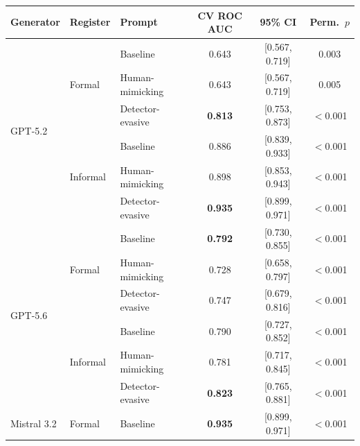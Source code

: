 \begin{table}[h!]
  \centering
  \small
  \begin{tabular}{lllccc}
    \toprule
    Generator & Register & Prompt & CV ROC AUC & 95\% CI & Perm.\ $p$ \\
    \midrule
    \multirow{6}{*}{GPT-5.2}
      & \multirow{3}{*}{Formal}
        & Baseline         & 0.643 & [0.567, 0.719] & 0.003 \\
      & & Human-mimicking  & 0.643 & [0.567, 0.719] & 0.005 \\
      & & Detector-evasive & \textbf{0.813} & [0.753, 0.873] & $<$0.001 \\
    \cmidrule(l){2-6}
      & \multirow{3}{*}{Informal}
        & Baseline         & 0.886 & [0.839, 0.933] & $<$0.001 \\
      & & Human-mimicking  & 0.898 & [0.853, 0.943] & $<$0.001 \\
      & & Detector-evasive & \textbf{0.935} & [0.899, 0.971] & $<$0.001 \\
    \midrule
    \multirow{6}{*}{GPT-5.6}
      & \multirow{3}{*}{Formal}
        & Baseline         & \textbf{0.792} & [0.730, 0.855] & $<$0.001 \\
      & & Human-mimicking  & 0.728 & [0.658, 0.797] & $<$0.001 \\
      & & Detector-evasive & 0.747 & [0.679, 0.816] & $<$0.001 \\
    \cmidrule(l){2-6}
      & \multirow{3}{*}{Informal}
        & Baseline         & 0.790 & [0.727, 0.852] & $<$0.001 \\
      & & Human-mimicking  & 0.781 & [0.717, 0.845] & $<$0.001 \\
      & & Detector-evasive & \textbf{0.823} & [0.765, 0.881] & $<$0.001 \\
    \midrule
    \multirow{6}{*}{Mistral 3.2}
      & \multirow{3}{*}{Formal}
        & Baseline         & \textbf{0.935} & [0.899, 0.971] & $<$0.001 \\

\end{tabular}
\end{table}
